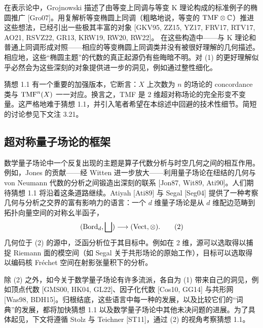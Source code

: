 在表示论中，Grojnowski 描述了由等变上同调与等变 K 理论构成的标准例子的椭圆推广 [Gro07]。用复解析等变椭圆上同调（粗略地说，等变的 $\mathrm{TMF}\otimes\mathbb{C}$）推进这些想法，已经引出一些极其丰富的对象 [GKV95, ZZ15, YZ17, FRV17, RTV17, AO21, RSVZ22, GR13, KRW19, RW20, RW22]。
在这些构造中——与 K 理论和普通上同调形成对照——相应的等变椭圆上同调类并没有被很好理解的几何描述。相应地，这些“椭圆主题”的代数的真正起源仍有些晦暗不明。对 (1) 的更好理解似乎必然会为这些深刻的对象提供进一步的洞见，例如通过整性细化。

\begin{remark}[1.2]
猜想 1.1 有一个重要的加强版本，它断言：$X$ 上次数为 $n$ 的场论的 concordance 类与 $\mathrm{TMF}^n(X)$ 一一对应。换言之，TMF 是 2 维超对称场论的完全形变不变量。这严格地难于猜想 1.1，并引入笔者希望在本综述中回避的技术性细节。简短的讨论参见下文注 3.21。
\end{remark}

\subsection{超对称量子场论的框架}
数学量子场论中一个反复出现的主题是算子代数分析与时空几何之间的相互作用。例如，Jones 的贡献——经 Witten 进一步放大——利用量子场论在纽结的几何与 von Neumann 代数的分析之间锻造出深刻的联系 [Jon87, Wit89, Ati90]。人们期待猜想 1.1 将沿着这条道路继续。Atiyah [Ati89] 与 Segal [Seg04] 提供了一种考察几何与分析之交界的富有影响力的语言：一个 $d$ 维量子场论是从 $d$ 维配边范畴到拓扑向量空间的对称幺半函子，
\begin{equation}
(\operatorname{Bord}_d,\bigsqcup)\longrightarrow(\operatorname{Vect},\otimes).
\tag{2}
\end{equation}
几何位于 (2) 的源中，泛函分析位于其目标中。例如在 2 维，源可以选取得以捕捉 Riemann 面的模空间（如 Segal 关于共形场论的原始工作），目标可以选取得以编码核 Fréchet 空间在射影张量积下的分析。

除 (2) 之外，如今关于数学量子场论有许多流派，各自为 (1) 带来自己的洞见，例如顶点代数 [GMS00, HK04, GL22]、因子化代数 [Cos10, GG14] 与共形网 [Was98, BDH15]。归根结底，这些语言中每一种的发展，以及比较它们的“词典”的发展，都将加快猜想 1.1 以及数学量子场论中其他未决问题的进展。为了具体起见，下文将遵循 Stolz 与 Teichner [ST11]，通过 (2) 的视角考察猜想 1.1。

